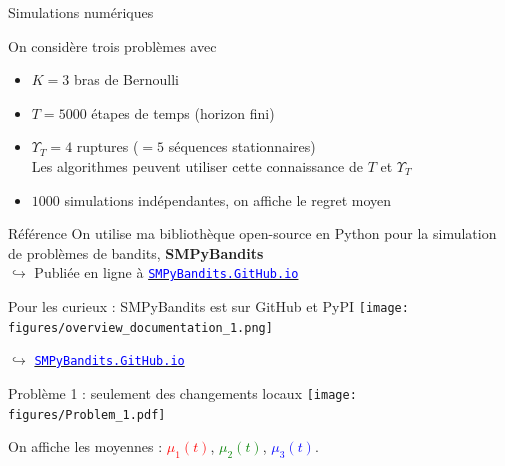 \documentclass[11pt,french,ignorenonframetext,]{beamer}
\begin{document}
\begin{frame}{Simulations numériques}

  \begin{block}{On considère trois problèmes avec}
    \begin{itemize}
      \item
      $K=3$ bras de Bernoulli
      \item
      $T=5000$ étapes de temps (horizon fini)
      \item
      $\Upsilon_T=4$ ruptures ($=5$ séquences stationnaires)\\
      Les algorithmes peuvent utiliser cette connaissance de $T$ et $\Upsilon_T$
      \item
      $1000$ simulations indépendantes, on affiche le regret moyen
    \end{itemize}
  \end{block}

  \pause

  \begin{exampleblock}{Référence}
      On utilise ma bibliothèque open-source en Python pour la simulation de problèmes de bandits, \textbf{SMPyBandits}
      \\
      $\hookrightarrow$ Publiée en ligne à \href{https://SMPyBandits.GitHub.io}{\textcolor{blue}{\texttt{SMPyBandits.GitHub.io}}}
  \end{exampleblock}

\end{frame}

\begin{frame}[plain]{Pour les curieux : SMPyBandits est sur GitHub et PyPI}
  \centering
  \texttt{[image: figures/overview\_documentation\_1.png]}

  $\hookrightarrow$ \href{https://SMPyBandits.GitHub.io}{\textcolor{blue}{\texttt{SMPyBandits.GitHub.io}}}
\end{frame}



\begin{frame}[plain]{Problème 1 : seulement des changements locaux}
  \centering
  \texttt{[image: figures/Problem\_1.pdf]}

  On affiche les moyennes :
  \textcolor{red}{$\mu_1(t)$},
  \textcolor{green}{$\mu_2(t)$},
  \textcolor{blue}{$\mu_3(t)$}.
\end{frame}
\end{document}
